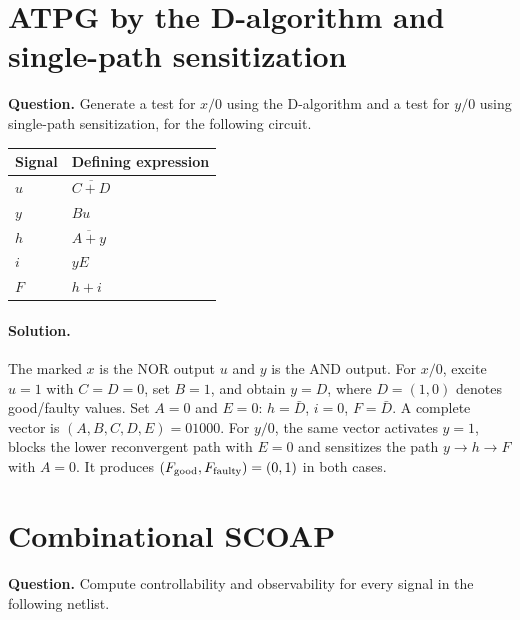 \documentclass[11pt]{article}
\newcommand{\sol}{\paragraph{Solution.}}
\begin{document}
\section{ATPG by the D-algorithm and single-path sensitization}
\textbf{Question.} Generate a test for $x/0$ using the D-algorithm and a test
for $y/0$ using single-path sensitization, for the following circuit.
\begin{center}\begin{tabular}{ll}\toprule Signal & Defining expression\\\midrule
$u$ & $\overline{C+D}$\\
$y$ & $Bu$\\
$h$ & $\overline{A+y}$\\
$i$ & $yE$\\
$F$ & $h+i$\\
\bottomrule\end{tabular}\end{center}
\begin{center}\end{center}
\sol The marked $x$ is the NOR output $u$ and $y$ is the AND output.
For $x/0$, excite $u=1$ with $C=D=0$, set $B=1$, and obtain $y=D$,
where $D=(1,0)$ denotes good/faulty values. Set $A=0$ and $E=0$:
$h=\bar D$, $i=0$, $F=\bar D$.
A complete vector is $(A,B,C,D,E)=01000$.
For $y/0$, the same vector activates $y=1$, blocks the lower reconvergent path
with $E=0$ and sensitizes the path $y\to h\to F$ with $A=0$.
It produces $(F_{\rm good},F_{\rm faulty})=(0,1)$ in both cases.\section{Combinational SCOAP}
\textbf{Question.} Compute controllability and observability for every signal in the following netlist.
\end{document}
